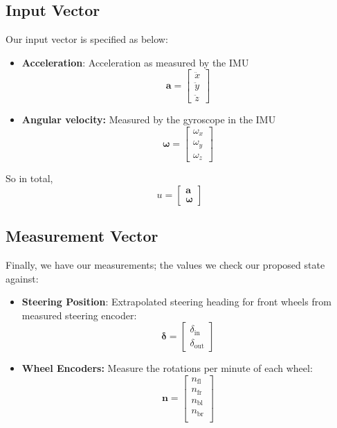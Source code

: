 \documentclass{article}
\begin{document}
\subsection{Input Vector}
Our input vector is specified as below:



\begin{itemize}
    \item \textbf{Acceleration}: Acceleration as measured by the IMU
    \[
    \bm{a} = \begin{bmatrix}
        \ddot{x} \\ \ddot{y}\\ \ddot{z}
    \end{bmatrix}
    \]
    \item \textbf{Angular velocity:} Measured by the gyroscope in the IMU
    \[
   \bm{\omega} = \begin{bmatrix}
    \omega_x \\ \omega_y \\ \omega_z
   \end{bmatrix}
    \]
\end{itemize}
So in total,
\[
u = \begin{bmatrix}
    \bm{a} \\ \bm{\omega}
\end{bmatrix}
\]

\subsection{Measurement Vector}
Finally, we have our measurements; the values we check our proposed state against:

\begin{itemize}
    \item \textbf{Steering Position}: Extrapolated steering heading for front wheels from measured steering encoder:
    \[
   \bm{\delta} = \begin{bmatrix}
    \delta_{\text{in}} \\ \delta_{\text{out}}
   \end{bmatrix}
    \]
    \item \textbf{Wheel Encoders:} Measure the rotations per minute of each wheel:
    \[
        \bm{n} = \begin{bmatrix}
           n_{\text{fl}} \\
           n_{\text{fr}} \\
           n_{\text{bl}} \\
           n_{\text{br}} \\
        \end{bmatrix}
    \]
\end{itemize}
\end{document}
